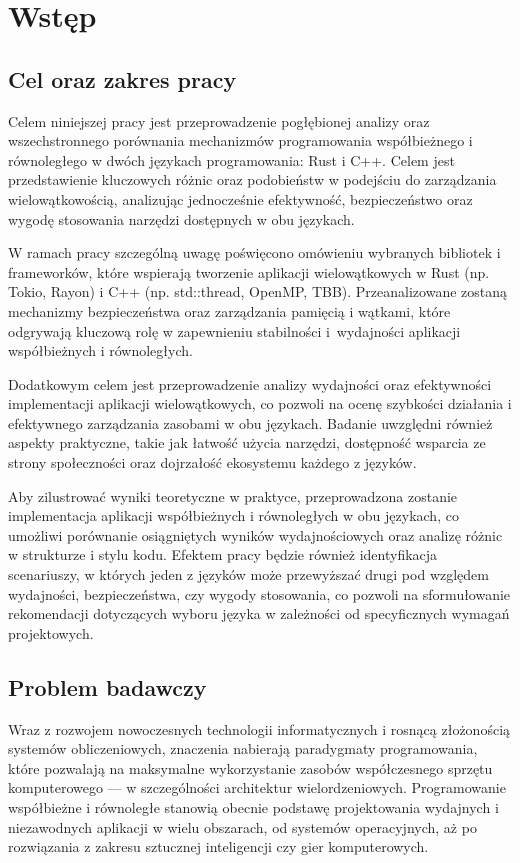 \chapter[Wstęp]{Wstęp}
\section{Cel oraz zakres pracy}
Celem niniejszej pracy jest przeprowadzenie pogłębionej analizy oraz wszechstronnego porównania mechanizmów programowania współbieżnego i równoległego w dwóch językach programowania: Rust i C++. Celem jest przedstawienie kluczowych różnic oraz podobieństw w podejściu do zarządzania wielowątkowością, analizując jednocześnie efektywność, bezpieczeństwo oraz wygodę stosowania narzędzi dostępnych w obu językach.

W ramach pracy szczególną uwagę poświęcono omówieniu wybranych bibliotek i frameworków, które wspierają tworzenie aplikacji wielowątkowych w Rust (np. Tokio, Rayon) i C++ (np. std::thread, OpenMP, TBB). Przeanalizowane zostaną mechanizmy bezpieczeństwa oraz zarządzania pamięcią i wątkami, które odgrywają kluczową rolę w zapewnieniu stabilności i~wydajności aplikacji współbieżnych i równoległych.

Dodatkowym celem jest przeprowadzenie analizy wydajności oraz efektywności implementacji aplikacji wielowątkowych, co pozwoli na ocenę szybkości działania i efektywnego zarządzania zasobami w obu językach. Badanie uwzględni również aspekty praktyczne, takie jak łatwość użycia narzędzi, dostępność wsparcia ze strony społeczności oraz dojrzałość ekosystemu każdego z języków.

Aby zilustrować wyniki teoretyczne w praktyce, przeprowadzona zostanie implementacja aplikacji współbieżnych i równoległych w obu językach, co umożliwi porównanie osiągniętych wyników wydajnościowych oraz analizę różnic w strukturze i stylu kodu. Efektem pracy będzie również identyfikacja scenariuszy, w których jeden z języków może przewyższać drugi pod względem wydajności, bezpieczeństwa, czy wygody stosowania, co pozwoli na sformułowanie rekomendacji dotyczących wyboru języka w zależności od specyficznych wymagań projektowych.
\section{Problem badawczy}
Wraz z rozwojem nowoczesnych technologii informatycznych i rosnącą złożonością systemów obliczeniowych, znaczenia nabierają paradygmaty programowania, które pozwalają na maksymalne wykorzystanie zasobów współczesnego sprzętu komputerowego — w szczególności architektur wielordzeniowych. Programowanie współbieżne i równoległe stanowią obecnie podstawę projektowania wydajnych i niezawodnych aplikacji w wielu obszarach, od systemów operacyjnych, aż po rozwiązania z zakresu sztucznej inteligencji czy gier komputerowych.

